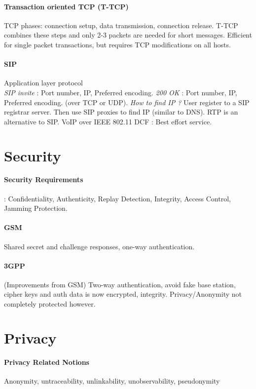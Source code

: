 \documentclass[6pt]{scrartcl}
\begin{document}
\begin{multicols}{4}
\paragraph{Transaction oriented TCP (T-TCP)} TCP phases: connection setup, data transmission, connection release. T-TCP combines these steps and only 2-3 packets are needed for short messages. Efficient for single packet transactions, but requires TCP modifications on all hosts.
\paragraph{SIP} Application layer protocol\\
\emph{SIP invite} : Port number, IP, Preferred encoding. \emph{200 OK} : Port number, IP, Preferred encoding. (over TCP or UDP). \emph{How to find IP ?} User register to a SIP registrar server. Then use SIP proxies to find IP (similar to DNS). RTP is an alternative to SIP. VoIP over IEEE 802.11 DCF : Best effort service.





\section{Security}
\paragraph{Security Requirements}: Confidentiality, Authenticity, Replay Detection, Integrity, Access Control, Jamming Protection.
\paragraph{GSM} Shared secret and challenge responses, one-way authentication.
\paragraph{3GPP} (Improvements from GSM) Two-way authentication, avoid fake base station, cipher keys and auth data is now encrypted, integrity. Privacy/Anonymity not completely protected however.

\section{Privacy}
\paragraph{Privacy Related Notions}Anonymity, untraceability, unlinkability, unobservability, pseudonymity

\end{multicols}
\end{document}

